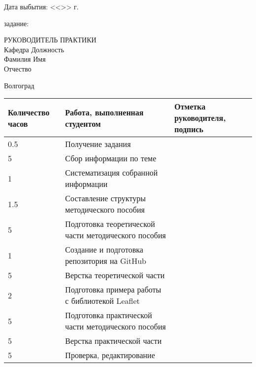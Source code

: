\documentclass[a4paper, 14pt]{extreport}
\begin{document}
\begin{titlepage}
\begin{flushleft}
            Дата выбытия: \hspace{3cm}<<\underline{\hspace{1cm}}>> \underline{\hspace{3cm}} \the\year г.
        \end{flushleft}
        \vspace{1cm}
         задание: \underline{\hspace{10.7cm}}\\
        \underline{\hspace{16.5cm}}
        \vspace{1cm}
        \begin{flushleft}
            РУКОВОДИТЕЛЬ ПРАКТИКИ\\
            Кафедра \underline{\hspace{5cm}} Должность \underline{\hspace{5cm}} \\
            Фамилия \underline{\hspace{4.9cm}} Имя \underline{\hspace{6.5cm}}\\
            Отчество \underline{\hspace{4.9cm}}
        \end{flushleft}
        \vspace{\fill}
        \begin{center}
            Волгоград \the\year
        \end{center}
    \end{titlepage}
    \begin{table}[h!]
        \centering
        \begin{tabular}{|*{3}{m{}|}}
            \hline 
            Количество часов & Работа, выполненная студентом & Отметка руководителя, подпись \\ \hline
            0.5 & Получение задания & \\ \hline
              5 & Сбор информации по теме & \\ \hline
              1 & Систематизация собранной информации & \\ \hline
            1.5 & Составление структуры методического пособия & \\ \hline
              5 & Подготовка теоретической части методического пособия & \\ \hline
              1 & Создание и подготовка репозитория на GitHub & \\ \hline
              5 & Верстка теоретической части & \\ \hline
              2 & Подготовка примера работы с библиотекой Leaflet & \\ \hline
              5 & Подготовка практической части методического пособия & \\ \hline
              5 & Верстка практической части & \\ \hline
              5 & Проверка, редактирование & \\ \hline
        \end{tabular}
    \end{table}
\end{document}
